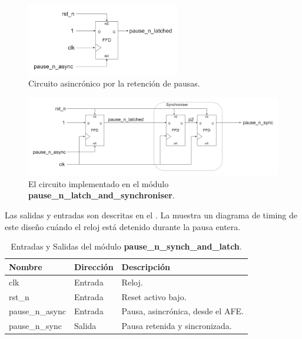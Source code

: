 \documentclass[a4paper, twoside, 11pt]{report}
\begin{document}
\begin{figure}[htb]
  \centering
  \includegraphics[width=0.6\textwidth]{./img/pause_latch_and_synch1_latching.drawio}
  \caption{Circuito asincrónico por la retención de pausas.}
  \label{fig:pause_n_latch}
\end{figure}

\begin{figure}[htb]
  \centering
  \includegraphics[width=1.0\textwidth]{./img/pause_latch_and_synch1_ffd.drawio}
  \caption{\small{El circuito implementado en el módulo \textbf{pause\_n\_latch\_and\_synchroniser}.}}
  \label{fig:pause_n_synch_and_latch}
\end{figure}

\FloatBarrier

Las salidas y entradas son descritas en el . La  muestra un diagrama de timing de este diseño cuándo el reloj está detenido durante la pausa entera.

\begin{table}[htb]
  \centering
  \tablezebra
  \begin{tabulary}{\linewidth}{l|l|L}
    \textbf{Nombre}&\textbf{Dirección}&\textbf{Descripción} \\
    \hline
    clk&Entrada&Reloj. \\
    rst\_n&Entrada&Reset activo bajo. \\
    pause\_n\_async&Entrada&Pausa, asincrónica, desde el AFE. \\
    pause\_n\_sync&Salida &Pausa retenida y sincronizada. \\
  \end{tabulary}
  \caption{Entradas y Salidas del módulo \textbf{pause\_n\_synch\_and\_latch}.}
  \label{tab:ports_pause_n_synch_and_latch}
\end{table}
\end{document}

